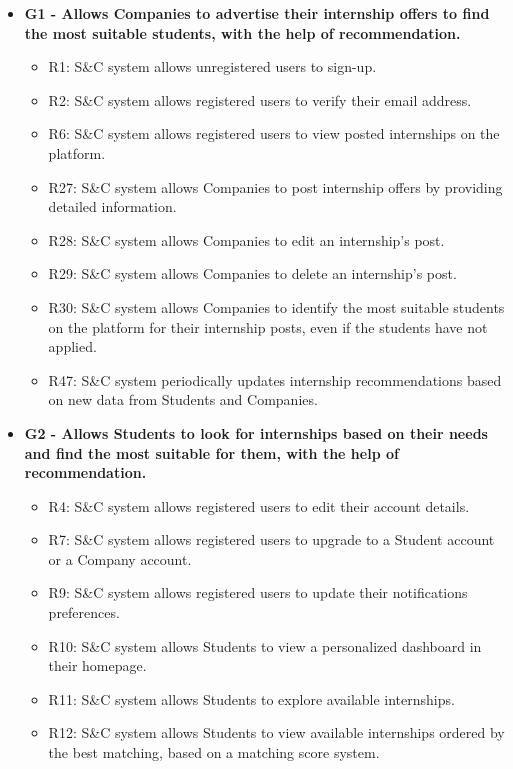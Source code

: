 \begin{itemize}
    \item \textbf{G1 - Allows Companies to advertise their internship offers to find the most suitable students, with the help of recommendation.}
    \begin{itemize}
        \item R1: S\&C system allows unregistered users to sign-up.
        \item R2: S\&C system allows registered users to verify their email address.
        \item R6: S\&C system allows registered users to view posted internships on the platform.
        \item R27: S\&C system allows Companies to post internship offers by providing detailed information.
        \item R28: S\&C system allows Companies to edit an internship's post.
        \item R29: S\&C system allows Companies to delete an internship's post.
        \item R30: S\&C system allows Companies to identify the most suitable students on the platform for their internship posts, even if the students have not applied.
        \item R47: S\&C system periodically updates internship recommendations based on new data from Students and Companies.
    \end{itemize}
    \item \textbf{G2 - Allows Students to look for internships based on their needs and find the most suitable for them, with the help of recommendation.}
    \begin{itemize}
        \item R4: S\&C system allows registered users to edit their account details.
        \item R7: S\&C system allows registered users to upgrade to a Student account or a Company account.
        \item R9: S\&C system allows registered users to update their notifications preferences.
        \item R10: S\&C system allows Students to view a personalized dashboard in their homepage.
        \item R11: S\&C system allows Students to explore available internships.
        \item R12: S\&C system allows Students to view available internships ordered by the best matching, based on a matching score system.

\end{itemize}
\end{itemize}

